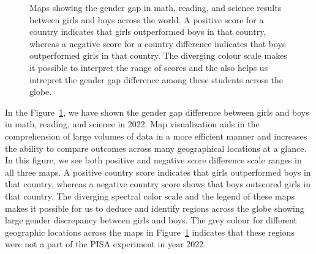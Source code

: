 \documentclass[
  11pt,
  a4paper,
]{article}
\begin{document}
\begin{figure}[H]


\caption{\label{fig-worldmaps}Maps showing the gender gap in math,
reading, and science results between girls and boys across the world. A
positive score for a country indicates that girls outperformed boys in
that country, whereas a negative score for a country difference
indicates that boys outperformed girls in that country. The diverging
colour scale makes it possible to interpret the range of scores and the
also helps us intrepret the gender gap difference among these students
across the globe.}

\end{figure}%

In the Figure~\ref{fig-worldmaps}, we have shown the gender gap
difference between girls and boys in math, reading, and science in 2022.
Map visualization aids in the comprehension of large volumes of data in
a more efficient manner and increases the ability to compare outcomes
across many geographical locations at a glance. In this figure, we see
both positive and negative score difference scale ranges in all three
maps. A positive country score indicates that girls outperformed boys in
that country, whereas a negative country score shows that boys outscored
girls in that country. The diverging spectral color scale and the legend
of these maps makes it possible for us to deduce and identify regions
across the globe showing large gender discrepancy between girls and
boys. The grey colour for different geographic locations across the maps
in Figure~\ref{fig-worldmaps} indicates that these regions were not a
part of the PISA experiment in year 2022.
\end{document}
